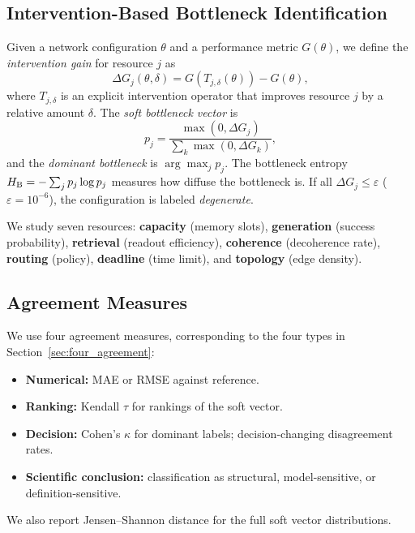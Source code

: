 \documentclass{ams-journal}
\newcommand{\DG}{\Delta G}
\newcommand{\HB}{H_{\rm B}}
\begin{document}
\subsection{Intervention-Based Bottleneck Identification}

Given a network configuration $\theta$ and a performance metric $G(\theta)$, we define the \emph{intervention gain} for resource $j$ as
\begin{equation}
\DG_j(\theta, \delta) = G(T_{j,\delta}(\theta)) - G(\theta),
\end{equation}
where $T_{j,\delta}$ is an explicit intervention operator that improves resource $j$ by a relative amount $\delta$. The \emph{soft bottleneck vector} is
\begin{equation}
p_j = \frac{\max(0, \DG_j)}{\sum_k \max(0, \DG_k)},
\end{equation}
and the \emph{dominant bottleneck} is $\arg\max_j p_j$. The bottleneck entropy $\HB = -\sum_j p_j \log p_j$ measures how diffuse the bottleneck is. If all $\DG_j \leq \varepsilon$ ($\varepsilon = 10^{-6}$), the configuration is labeled \emph{degenerate}.

We study seven resources: \textbf{capacity} (memory slots), \textbf{generation} (success probability), \textbf{retrieval} (readout efficiency), \textbf{coherence} (decoherence rate), \textbf{routing} (policy), \textbf{deadline} (time limit), and \textbf{topology} (edge density).

\subsection{Agreement Measures}

We use four agreement measures, corresponding to the four types in Section~\ref{sec:four_agreement}:
\begin{itemize}[leftmargin=2em]
\item \textbf{Numerical:} MAE or RMSE against reference.
\item \textbf{Ranking:} Kendall $\tau$ for rankings of the soft vector.
\item \textbf{Decision:} Cohen's $\kappa$ for dominant labels; decision-changing disagreement rates.
\item \textbf{Scientific conclusion:} classification as structural, model-sensitive, or definition-sensitive.
\end{itemize}
We also report Jensen--Shannon distance for the full soft vector distributions.

\end{document}
